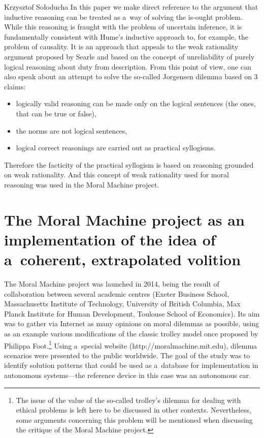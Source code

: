 \begin{artengenv}{Krzysztof Sołoducha}
In this paper we make direct reference to the argument that inductive reasoning can be treated as a~way of solving the is-ought problem. While this reasoning is fraught with the problem of uncertain inference, it is fundamentally consistent with Hume's inductive approach to, for example, the problem of causality. It is an approach that appeals to the weak rationality argument proposed by Searle
\parencite*[][]{searle_how_1964} %
 and based on the concept of unreliability of purely logical reasoning about duty from description. From this point of view, one can also speak about an attempt to solve the so-called Jorgensen dilemma 
\parencite[][]{jorgensen_imperatives_1937} %
 based on 3 claims:
\begin{itemize}
%
%
%
\item logically valid reasoning can be made only on the logical sentences (the ones, that can be true or false),
\item the norms are not logical sentences,
\item logical correct reasonings are carried out as practical syllogisms.
\end{itemize}
Therefore the facticity of the practical syllogism is based on reasoning grounded on weak rationality. And this concept of weak rationality used for moral reasoning was used in the Moral Machine project.

\section*{The Moral Machine project as an implementation of the idea of a~coherent, extrapolated volition}
The Moral Machine project was launched in 2014, being the result of collaboration between several academic centres (Exeter Business School, Massachusetts Institute of Technology, University of British Columbia, Max Planck Institute for Human Development, Toulouse School of Economics). Its aim was to gather via Internet as many opinions on moral dilemmas as possible, using as an example various modifications of the classic trolley model once proposed by Philippa Foot.\footnote{The issue of the value of the so-called trolley's dilemma for dealing with ethical problems is left here to be discussed in other contexts. Nevertheless, some arguments concerning this problem will be mentioned when discussing the critique of the Moral Machine project.} 
Using a~special website (http://moralmachine.mit.edu), dilemma scenarios were presented to the public worldwide. The goal of the study was to identify solution patterns that could be used as a~database for implementation in autonomous systems—the reference device in this case was an autonomous car.


\end{artengenv}
